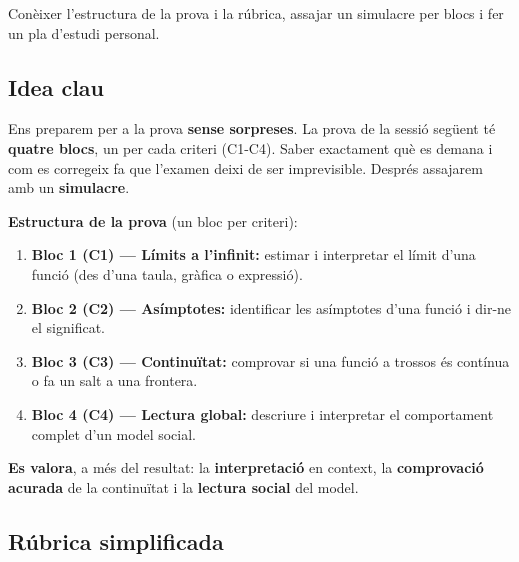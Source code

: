 %
{Conèixer l'estructura de la prova i la rúbrica, assajar un simulacre per blocs i fer un pla d'estudi personal.}

\subsection{Idea clau}

Ens preparem per a la prova \textbf{sense sorpreses}. La prova de la sessió següent té
\textbf{quatre blocs}, un per cada criteri (C1-C4). Saber exactament què es demana i
com es corregeix fa que l'examen deixi de ser imprevisible. Després assajarem amb un
\textbf{simulacre}.

\begin{idea}
\textbf{Estructura de la prova} (un bloc per criteri):
\begin{enumerate}[leftmargin=1.6em, itemsep=2pt]
  \item \textbf{Bloc 1 (C1) — Límits a l'infinit:} estimar i interpretar el límit d'una
        funció (des d'una taula, gràfica o expressió).
  \item \textbf{Bloc 2 (C2) — Asímptotes:} identificar les asímptotes d'una funció i
        dir-ne el significat.
  \item \textbf{Bloc 3 (C3) — Continuïtat:} comprovar si una funció a trossos és
        contínua o fa un salt a una frontera.
  \item \textbf{Bloc 4 (C4) — Lectura global:} descriure i interpretar el comportament
        complet d'un model social.
\end{enumerate}
\textbf{Es valora}, a més del resultat: la \textbf{interpretació} en context, la
\textbf{comprovació acurada} de la continuïtat i la \textbf{lectura social} del model.
\end{idea}

\subsection{Rúbrica simplificada}

